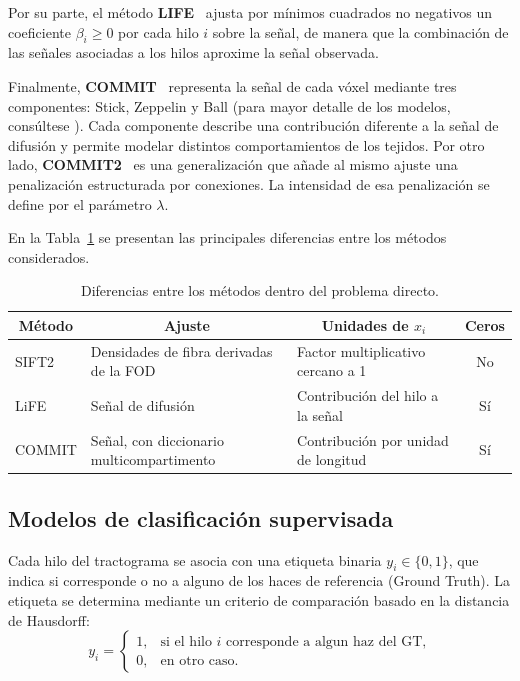 \documentclass[11pt,a4paper]{article}
\begin{document}
Por su parte, el método \textbf{LIFE}~\cite{pestilli2014} ajusta por mínimos cuadrados no negativos un coeficiente $\beta_i\ge 0$ por cada hilo $i$ sobre la señal, de manera que la combinación de las señales asociadas a los hilos aproxime la señal observada. 

Finalmente, \textbf{COMMIT}~\cite{daducci2015} representa la señal de cada vóxel mediante tres componentes: Stick, Zeppelin y Ball (para mayor detalle de los modelos, consúltese \cite{panagiotaki2012}). Cada componente describe una contribución diferente a la señal de difusión y permite modelar distintos comportamientos de los tejidos. Por otro lado, \textbf{COMMIT2}~\cite{schiavi2020} es una generalización que añade al mismo ajuste una penalización estructurada por conexiones. La intensidad de esa penalización se define por el  parámetro $\lambda$.

En la Tabla~\ref{tab:marco-metodos} se presentan las principales diferencias entre los métodos considerados.

\begin{table}[H]
\centering
\small
\begin{tabular}{@{}lllc@{}}
\toprule
\multicolumn{1}{c}{\textbf{M\'etodo}} & \multicolumn{1}{c}{\textbf{Ajuste}} &
\multicolumn{1}{c}{\textbf{Unidades de $x_i$}} & \textbf{Ceros}\\
\midrule
SIFT2  & Densidades de fibra derivadas de la FOD   & Factor multiplicativo cercano a 1   & No\\
LiFE   & Se\~nal de difusi\'on                     & Contribuci\'on del hilo a la se\~nal & S\'i\\
COMMIT & Se\~nal, con diccionario multicompartimento & Contribuci\'on por unidad de longitud & S\'i\\
\bottomrule
\end{tabular}
\caption{Diferencias entre los m\'etodos dentro del problema directo.}
\label{tab:marco-metodos}
\end{table}


\subsection{Modelos de clasificación supervisada}

Cada hilo del tractograma se asocia con una etiqueta binaria $y_i\in\{0,1\}$, que indica si corresponde o no a alguno de los haces de referencia (Ground Truth). La etiqueta se determina mediante un criterio de comparación basado en la distancia de Hausdorff: 
\[
    y_i = 
    \begin{cases}
        1, & \text{si el hilo $i$ corresponde a algun haz del GT,} \\
        0, & \text{en otro caso.}
    \end{cases}
\]
\end{document}
